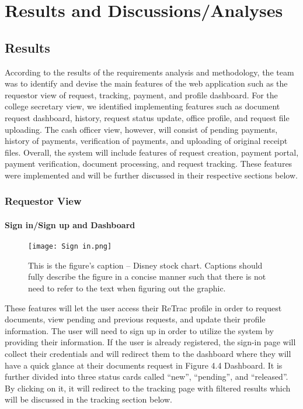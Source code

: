 
\chapter{Results and Discussions/Analyses}

\section{Results}

According to the results of the requirements analysis and methodology, the team was to identify and devise the main features of the web application such as the requestor view of request, tracking, payment, and profile dashboard. For the college secretary view, we identified implementing features such as document request dashboard, history, request status update, office profile, and request file uploading. The cash officer view, however, will consist of pending payments, history of payments, verification of payments, and uploading of original receipt files. Overall, the system will include features of request creation, payment portal, payment verification, document processing, and request tracking. These features were implemented and will be further discussed in their respective sections below.

\subsection{Requestor View}

\subsubsection{Sign in/Sign up and Dashboard}

\begin{figure}[t]                %
    \centering                    %
    \texttt{[image: Sign in.png]}      %
    \caption{This is the figure's caption -- Disney stock chart.
        Captions should fully describe the figure in a concise manner  such that there is not need to refer to the text when figuring out the graphic.}
     \label{fig:disneystock}
 \end{figure}

These features will let the user access their ReTrac profile in order to request documents, view pending and previous requests, and update their profile information. The user will need to sign up in order to utilize the system by providing their information. If the user is already registered, the sign-in page will collect their credentials and will redirect them to the dashboard where they will have a quick glance at their documents request in Figure 4.4 Dashboard. It is further divided into three status cards called “new”, “pending”, and “released”. By clicking on it, it will redirect to the tracking page with filtered results which will be discussed in the tracking section below.

